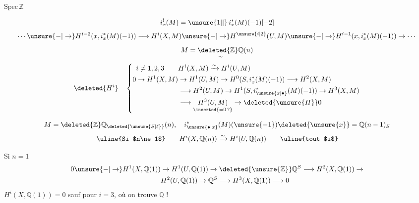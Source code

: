$\mathrm{Spec}\,\mathbb{Z}$

\[
i_x^!(M)=\unsure{1|\vert}\,i_x^*(M)(-1)[-2]
\]
\[
\cdots\unsure{-|\to}H^{i-2}(x,i_x^*(M)(-1))\longrightarrow H^i(X,M)\unsure{-|\to}H^{\unsure{i|2}}(U,M)\unsure{-|\to}H^{i-1}(x,i_x^*(M)(-1))\to\cdots
\]
\[
M=\underset{\sim}{\deleted{\mathbb{Z}}\mathbb{Q}}(n)
\]
\[
\deleted{H^i}\quad
\left\{\begin{aligned}
i\ne1,2,3\qquad&H^i(X,M)\xrightarrow{\sim}H^i(U,M)\\
0\to H^1(X,M)&\to H^1(U,M)\to H^0(S,i_x^*(M)(-1))\longrightarrow H^2(X,M)\\
&\longrightarrow H^2(U,M)\to H^1(S,i_{\unsure{x|\bullet}}^*(M)(-1))\to H^3(X,M)\\
&\longrightarrow\underset{\inserted{=0\,?}}{H^3(U,M)}\to\deleted{\unsure{H}}0
\end{aligned}\right.
\]

\[
M=\deleted{\mathbb{Z}}\mathbb{Q}_{\deleted{\unsure{S|\ell}}}(n),\quad i_{\unsure{\bullet|x}}^*(M)(\unsure{-1})\deleted{\unsure{x}}=\mathbb{Q}(n-1)_S
\]
\[
\text{\uline{Si $n\ne1$}}\qquad H^i(X,\mathbb{Q}(n))\xrightarrow{\sim}H^i(U,\mathbb{Q}(n))\qquad\text{\uline{tout $i$}}
\]

Si $n=1$
\[
\begin{aligned}
0\unsure{-|\to}H^1(X,\mathbb{Q}(1))&\to H^1(U,\mathbb{Q}(1))\to\deleted{\unsure{\mathbb{Z}}}\mathbb{Q}^S\longrightarrow H^2(X,\mathbb{Q}(1))\to\\
&H^2(U,\mathbb{Q}(1))\to\mathbb{Q}^S\longrightarrow H^3(X,\mathbb{Q}(1))\longrightarrow0
\end{aligned}
\]
$H^i(X,\mathbb{Q}(1))=0$ sauf pour $i=3$, où on trouve $\mathbb{Q}$ !

